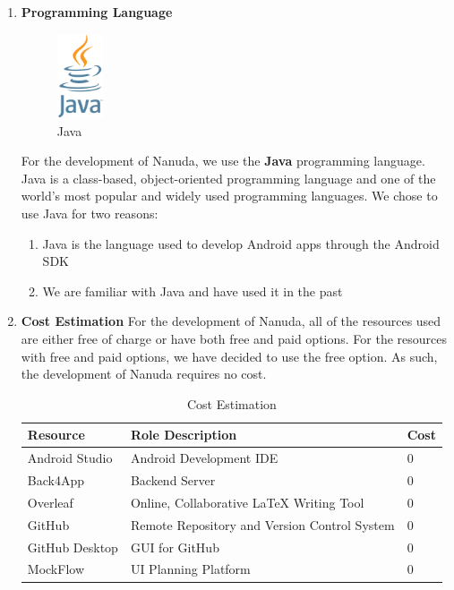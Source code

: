 \documentclass[conference]{IEEEtran}
\begin{document}
\begin{enumerate}
    \item \textbf{Programming Language}
        \newline
        \begin{figure}[htbp]
            \centerline{\includegraphics[height=25mm,scale=0.5]{img/logo-java.png}}
            \caption{Java}
            \label{fig:java-logo}
        \end{figure}
        \newline
        For the development of Nanuda, we use the \textbf{Java} programming language. Java is a class-based, object-oriented programming language and one of the world's most popular and widely used programming languages. We chose to use Java for two reasons:
        \begin{enumerate}
            \item Java is the language used to develop Android apps through the Android SDK
            \item We are familiar with Java and have used it in the past
        \end{enumerate}
    \item \textbf{Cost Estimation}
        \newline
        For the development of Nanuda, all of the resources used are either free of charge or have both free and paid options. For the resources with free and paid options, we have decided to use the free option. As such, the development of Nanuda requires no cost.
        \begin{center}
            \begin{table}[H]
            \centering
            \caption{Cost Estimation}
            \label{tab:cost-estimation}
            \begin{tabular}{|p{6em}|p{10em}|p{4em}|}
                \hline
                \textbf{Resource} & \textbf{Role Description} & \textbf{Cost} \\
                \hline
                Android Studio & Android Development IDE & 0 \\
                \hline
                Back4App & Backend Server & 0 \\
                \hline
                Overleaf & Online, Collaborative LaTeX Writing Tool & 0 \\
                \hline
                GitHub & Remote Repository and Version Control System & 0 \\
                \hline
                GitHub Desktop & GUI for GitHub & 0 \\
                \hline
                MockFlow & UI Planning Platform & 0 \\
                \hline
            \end{tabular}
            \end{table}
        \end{center} 
        

\end{enumerate}
\end{document}
